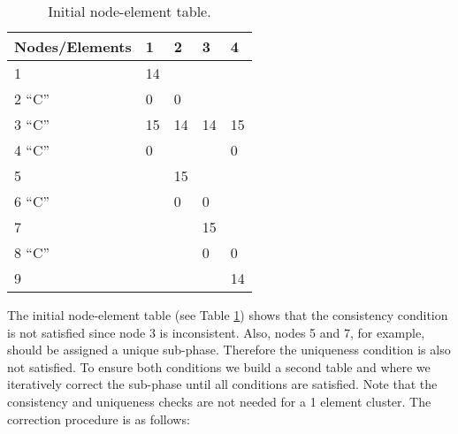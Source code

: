 \begin{table}[htbp]
	\centering
		\begin{tabular}{| l | p{2cm} | p{2cm} | p{2cm} | p{2cm} |}
		\hline
		Nodes/Elements & 1 & 2 & 3 & 4 \\ \hline
		1 		& 14	&		&		&		 \\ \hline
		2 ``C''	&  0	&  0	&		&		 \\ \hline
		3 ``C''	& 15	& 14	& 14	& 15	 \\ \hline
		4 ``C''	&  0	&		&		&  0 	 \\ \hline
		5		& 		& 15	&		& 		 \\ \hline
		6 ``C''	&  		&  0	&  0	&		 \\ \hline
		7		&		& 		& 15	&		 \\ \hline
		8 ``C''	&		&  		&  0	&  0	 \\ \hline
		9		&		&		&		& 14	 \\ \hline
		\end{tabular}
	\caption[Initial node-element table]{Initial node-element table.}
	\label{tab:initial-node-element-table}
\end{table}

The initial node-element table (see Table \ref{tab:initial-node-element-table}) shows that the consistency condition is not satisfied since node 3 is inconsistent. Also, nodes 5 and 7, for example, should be assigned a unique sub-phase. Therefore the uniqueness condition is also not satisfied. To ensure both conditions we build a second table and where we iteratively correct the sub-phase until all conditions are satisfied. Note that the consistency and uniqueness checks are not needed for a 1 element cluster. The correction procedure is as follows:

